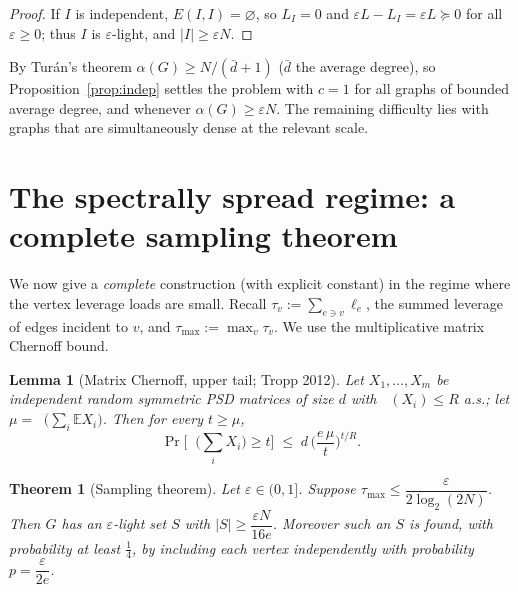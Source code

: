\documentclass[12pt]{article}
\DeclareMathOperator*{\lammax}{\lambda_{\max}}
\newcommand{\eps}{\varepsilon}
\newtheorem{theorem}{Theorem}
\newtheorem{lemma}{Lemma}
\theoremstyle{definition}
\begin{document}
\begin{proof}
If $I$ is independent, $E(I,I)=\varnothing$, so $L_I=0$ and
$\eps L-L_I=\eps L\succeq0$ for all $\eps\ge0$; thus $I$ is $\eps$-light, and
$|I|\ge\eps N$.
\end{proof}

By Turán's theorem $\alpha(G)\ge N/(\bar d+1)$ ($\bar d$ the average degree), so
Proposition~\ref{prop:indep} settles the problem with $c=1$ for all graphs of
bounded average degree, and whenever $\alpha(G)\ge\eps N$. The remaining
difficulty lies with graphs that are simultaneously dense at the relevant scale.

\section{The spectrally spread regime: a complete sampling theorem}

We now give a \emph{complete} construction (with explicit constant) in the
regime where the vertex leverage loads are small. Recall
$\tau_v:=\sum_{e\ni v}\ell_e$, the summed leverage of edges incident to $v$, and
$\tau_{\max}:=\max_{v}\tau_v$. We use the multiplicative matrix Chernoff bound.

\begin{lemma}[Matrix Chernoff, upper tail; Tropp 2012]\label{lem:tropp}
Let $X_1,\dots,X_m$ be independent random symmetric PSD matrices of size $d$ with
$\lammax(X_i)\le R$ a.s.; let $\mu=\lammax\!\big(\sum_i\mathbb E X_i\big)$. Then
for every $t\ge\mu$,
\[
  \Pr\Big[\lammax\!\big(\textstyle\sum_i X_i\big)\ge t\Big]
  \;\le\; d\,\Big(\frac{e\,\mu}{t}\Big)^{t/R}.
\]
\end{lemma}

\begin{theorem}[Sampling theorem]\label{thm:sample}
Let $\eps\in(0,1]$. Suppose $\tau_{\max}\le\dfrac{\eps}{2\log_2(2N)}$. Then $G$
has an $\eps$-light set $S$ with $|S|\ge\dfrac{\eps N}{16e}$. Moreover such an $S$
is found, with probability at least $\tfrac14$, by including each vertex
independently with probability $p=\dfrac{\eps}{2e}$.
\end{theorem}
\end{document}
